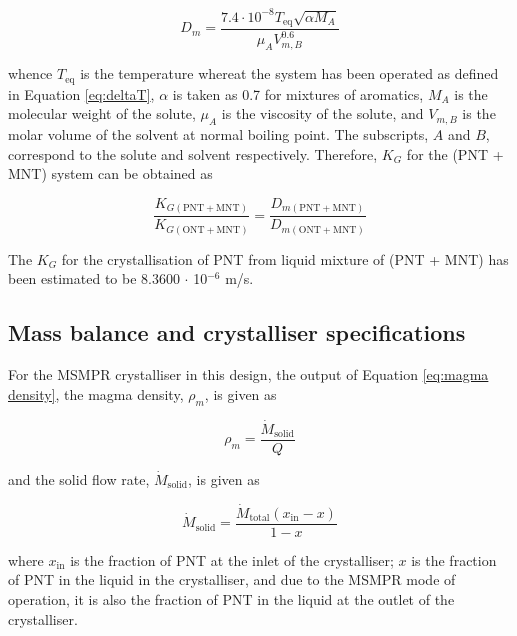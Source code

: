 \begin{equation}
    D_m = \frac{7.4 \cdot 10^{-8} T_{\mathrm{eq}} \sqrt{\alpha M_A}}{\mu_A V_{m,B}^0.6}
\end{equation}

\noindent whence $T_{\mathrm{eq}}$ is the temperature whereat the system has been operated as defined in Equation \ref{eq:deltaT}, $\alpha$ is taken as 0.7 for mixtures of aromatics, $M_A$ is the molecular weight of the solute, $\mu_A$ is the viscosity of the solute, and $V_{m,B}$ is the molar volume of the solvent at normal boiling point. The subscripts, $A$ and $B$, correspond to the solute and solvent respectively. Therefore, $K_G$ for the (PNT + MNT) system can be obtained as 

\begin{equation} \label{eq:ratio of growth kinetics}
    \frac{K_{G\mathrm{(PNT + MNT)}}}{K_{G\mathrm{(ONT + MNT)}}} = \frac{D_{m\mathrm{(PNT + MNT)}}}{D_{m\mathrm{(ONT + MNT)}}}
\end{equation}

\noindent The $K_G$ for the crystallisation of PNT from liquid mixture of (PNT + MNT) has been estimated to be 8.3600 $\cdot$ 10$^{-6}$ m/s. 

\subsection{Mass balance and crystalliser specifications} \label{sec: crystalliser mass balance}

For the MSMPR crystalliser in this design, the output of Equation \ref{eq:magma density}, the magma density, $\rho_m$, is given as 

\begin{equation}
    \rho_m = \frac{\dot{M}_{\mathrm{solid}}}{Q}
\end{equation}

\noindent and the solid flow rate, $\dot{M}_{\mathrm{solid}}$, is given as

\begin{equation}
    \dot{M}_{\mathrm{solid}} = \frac{\dot{M}_{\mathrm{total}} (x_{\mathrm{in}} - x)}{1 - x}
\end{equation}

\noindent where $x_{\mathrm{in}}$ is the fraction of PNT at the inlet of the crystalliser; $x$ is the fraction of PNT in the liquid in the crystalliser, and due to the MSMPR mode of operation, it is also the fraction of PNT in the liquid at the outlet of the crystalliser.

